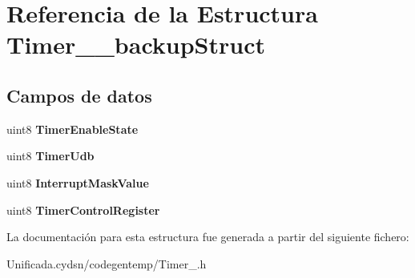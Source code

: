 \hypertarget{struct_timer__2__backup_struct}{}\section{Referencia de la Estructura Timer\+\_\+\_\+backup\+Struct}
\label{struct_timer__2__backup_struct}
\subsection*{Campos de datos}
\begin{DoxyCompactItemize}
\item 
\mbox{\label{struct_timer__2__backup_struct_a02d7a5264610dd17ede2bf5d1a8274cf}} 
uint8 {\bfseries Timer\+Enable\+State}
\item 
\mbox{\label{struct_timer__2__backup_struct_a30219438feaa9b90e8b9ffed577452ec}} 
uint8 {\bfseries Timer\+Udb}
\item 
\mbox{\label{struct_timer__2__backup_struct_a0eb909e8b6356ae6094cb5297e54e71a}} 
uint8 {\bfseries Interrupt\+Mask\+Value}
\item 
\mbox{\label{struct_timer__2__backup_struct_adbbbbbf743ffcd2219f83c6b37df7a11}} 
uint8 {\bfseries Timer\+Control\+Register}
\end{DoxyCompactItemize}


La documentación para esta estructura fue generada a partir del siguiente fichero\+:\begin{DoxyCompactItemize}
\item 
Unificada.\+cydsn/codegentemp/Timer\+\_.\+h\end{DoxyCompactItemize}
